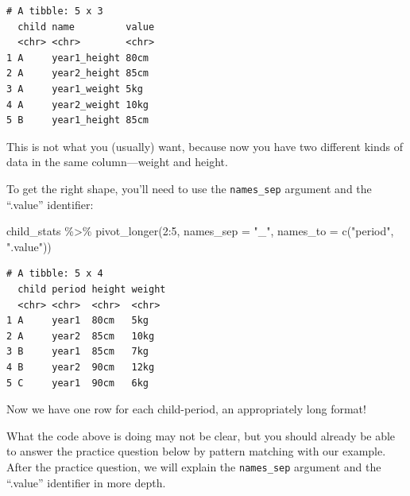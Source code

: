 \documentclass[
  letterpaper,
  DIV=11,
  numbers=noendperiod]{scrreprt}
\newenvironment{Shaded}{\begin{snugshade}}{\end{snugshade}}
\newcommand{\AttributeTok}[1]{\textcolor[rgb]{0.40,0.45,0.13}{#1}}
\newcommand{\DecValTok}[1]{\textcolor[rgb]{0.68,0.00,0.00}{#1}}
\newcommand{\FunctionTok}[1]{\textcolor[rgb]{0.28,0.35,0.67}{#1}}
\newcommand{\NormalTok}[1]{\textcolor[rgb]{0.00,0.23,0.31}{#1}}
\newcommand{\SpecialCharTok}[1]{\textcolor[rgb]{0.37,0.37,0.37}{#1}}
\newcommand{\StringTok}[1]{\textcolor[rgb]{0.13,0.47,0.30}{#1}}
\begin{document}
\begin{verbatim}
# A tibble: 5 x 3
  child name         value
  <chr> <chr>        <chr>
1 A     year1_height 80cm 
2 A     year2_height 85cm 
3 A     year1_weight 5kg  
4 A     year2_weight 10kg 
5 B     year1_height 85cm 
\end{verbatim}

This is not what you (usually) want, because now you have two different
kinds of data in the same column---weight and height.

To get the right shape, you'll need to use the \texttt{names\_sep}
argument and the ``.value'' identifier:

\begin{Shaded}
\begin{Highlighting}[]
\NormalTok{child\_stats }\SpecialCharTok{\%\textgreater{}\%} 
  \FunctionTok{pivot\_longer}\NormalTok{(}\DecValTok{2}\SpecialCharTok{:}\DecValTok{5}\NormalTok{, }
               \AttributeTok{names\_sep =} \StringTok{"\_"}\NormalTok{,}
               \AttributeTok{names\_to =} \FunctionTok{c}\NormalTok{(}\StringTok{"period"}\NormalTok{, }\StringTok{".value"}\NormalTok{))}
\end{Highlighting}
\end{Shaded}

\begin{verbatim}
# A tibble: 5 x 4
  child period height weight
  <chr> <chr>  <chr>  <chr> 
1 A     year1  80cm   5kg   
2 A     year2  85cm   10kg  
3 B     year1  85cm   7kg   
4 B     year2  90cm   12kg  
5 C     year1  90cm   6kg   
\end{verbatim}

Now we have one row for each child-period, an appropriately long format!

What the code above is doing may not be clear, but you should already be
able to answer the practice question below by pattern matching with our
example. After the practice question, we will explain the
\texttt{names\_sep} argument and the ``.value'' identifier in more
depth.
\end{document}
